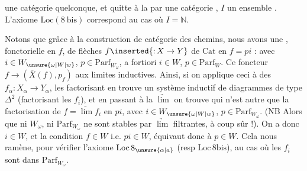 une  catégorie  quelconque, et quitte à la  par une catégorie ,  $I$ un ensemble . L'axiome $\mathrm{Loc}(8\ \mathrm{bis})$ correspond au cas où $I=\mathbb{N}$.

Notons que grâce à la construction de   catégorie des chemins, nous avons une  , fonctorielle en $f$, de  flèches $f\inserted{{:}\,X\to Y}$ de $\mathrm{Cat}$ en $f=pi$ :
avec $i\in W_{\unsure{\omega|W|w}}$, $p\in\mathrm{Parf}_{W_\omega}$, a fortiori $i\in W$, $p\in\mathrm{Parf}_W$. Ce foncteur $f\longrightarrow(\overline X(f),p_f)$  aux limites inductives.
Ainsi, si on applique ceci à  des $f_\alpha:X_\alpha\longrightarrow Y_\alpha$, les factorisant en
  trouve un système inductif de diagrammes de type $\Delta^2$ (factorisant les $f_i$), et en passant à la $\underrightarrow{\lim}$ on trouve
qui n'est autre que la factorisation 
de $f=\underrightarrow{\lim} f_i$ en $pi$, avec $i\in W_{\unsure{\omega|W|w}}$, $p\in\mathrm{Parf}_{W_\omega}$. (NB Alors que ni $W_\omega$, ni $\mathrm{Parf}_{W_\omega}$ ne sont stables par $\underrightarrow{\lim}$ filtrantes, à coup sûr !). On a donc $i\in W$, et  la condition $f\in W$ i.e. $pi\in W$, équivaut donc à $p\in W$.
Cela nous ramène, pour vérifier l'axiome $\mathrm{Loc}\,8_{\unsure{\alpha|a}}$ (resp $\mathrm{Loc}\,8\mathrm{bis}$), au cas où les $f_i$ sont dans $\mathrm{Parf}_{W_\omega}$.

